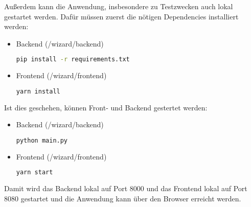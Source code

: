 Außerdem kann die Anwendung, insbesondere zu Testzwecken auch lokal gestartet werden. Dafür müssen zuerst die nötigen Dependencies installiert werden:

\begin{itemize}
	\item Backend (/wizard/backend)
	\begin{lstlisting}[language=bash]
	pip install -r requirements.txt
	\end{lstlisting}
	\item Frontend (/wizard/frontend)
	\begin{lstlisting}[language=bash]
	yarn install
	\end{lstlisting}
\end{itemize}

Ist dies geschehen, können Front- und Backend gestertet werden:

\begin{itemize}
	\item Backend (/wizard/backend)
	\begin{lstlisting}[language=bash]
	python main.py
	\end{lstlisting}
	\item Frontend (/wizard/frontend)
	\begin{lstlisting}[language=bash]
	yarn start
	\end{lstlisting}
\end{itemize}

Damit wird das Backend lokal auf Port 8000 und das Frontend lokal auf Port 8080 gestartet und die Anwendung kann über den Browser erreicht werden.